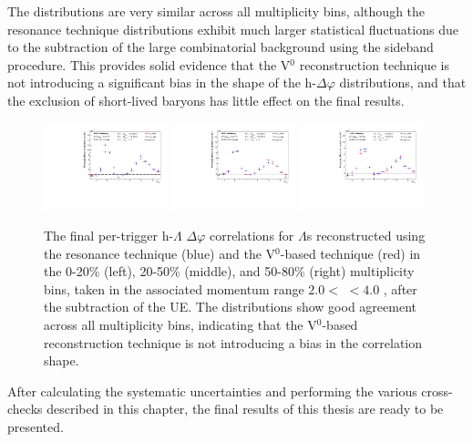 The distributions are very similar across all multiplicity bins, although the resonance technique distributions exhibit much larger statistical fluctuations due to the subtraction of the large combinatorial background using the sideband procedure. This provides solid evidence that the V$^0$ reconstruction technique is not introducing a significant bias in the shape of the h-\lmb $\Delta\varphi$ distributions, and that the exclusion of short-lived \lmb baryons has little effect on the final results.

\begin{figure}[h!]
    \centering
    \includegraphics[width=0.32\textwidth]{figures/analysis/h_lambda_dphi_0_20_zeroed_rescomp.pdf}
    \includegraphics[width=0.32\textwidth]{figures/analysis/h_lambda_dphi_20_50_zeroed_rescomp.pdf}
    \includegraphics[width=0.32\textwidth]{figures/analysis/h_lambda_dphi_50_80_zeroed_rescomp.pdf}
    \caption{The final per-trigger h-$\Lambda$ $\Delta\varphi$ correlations for $\Lambda$s reconstructed using the resonance technique (blue) and the V$^{0}$-based technique (red) in the 0-20\% (left), 20-50\% (middle), and 50-80\% (right) multiplicity bins, taken in the associated momentum range $2.0 <$ \pt $< 4.0$ \GeVc, after the subtraction of the UE. The distributions show good agreement across all multiplicity bins, indicating that the V$^{0}$-based reconstruction technique is not introducing a bias in the correlation shape.}
    \label{fig:resonance_v0_dphi_comp}
\end{figure}

After calculating the systematic uncertainties and performing the various cross-checks described in this chapter, the final results of this thesis are ready to be presented.